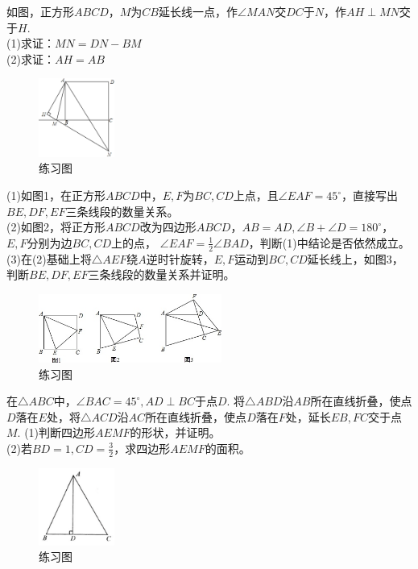 \documentclass{ecnuthesis}
\begin{document}
\begin{problem}
    如图，正方形$ABCD$，$M$为$CB$延长线一点，作$\angle MAN$交$DC$于$N$，作$AH\perp MN$交于$H$.\\
    (1)求证：$MN=DN-BM$ \\
    (2)求证：$AH=AB$
\end{problem}
\begin{figure}[H]
\centering
\includegraphics[width=2.5cm]{picture/6106.png}
\caption{练习图}
\end{figure}
\begin{problem}
    (1)如图1，在正方形$ABCD$中，$E,F$为$BC,CD$上点，且$\angle EAF=45^\circ$，直接写出$BE,DF,EF$三条线段的数量关系。 \\
    (2)如图2，将正方形$ABCD$改为四边形$ABCD$，$AB=AD,\angle B+\angle D=180^\circ$，$E,F$分别为边$BC,CD$上的点，
    $\angle EAF=\frac{1}{2}\angle BAD$，判断(1)中结论是否依然成立。 \\
    (3)在(2)基础上将$\triangle AEF$绕$A$逆时针旋转，$E,F$运动到$BC,CD$延长线上，如图3，判断$BE,DF,EF$三条线段的数量关系并证明。 \\
\end{problem}
\begin{figure}[H]
\centering
\includegraphics[width=6cm]{picture/6107.jpg}
\caption{练习图}
\end{figure}
\begin{problem}
    在$\triangle ABC$中，$\angle BAC=45^\circ,AD\perp BC$于点$D$.
    将$\triangle ABD$沿$AB$所在直线折叠，使点$D$落在$E$处，将$\triangle ACD$沿$AC$所在直线折叠，使点$D$落在$F$处，延长$EB,FC$交于点$M$.
    (1)判断四边形$AEMF$的形状，并证明。\\
    (2)若$BD=1,CD=\frac{3}{2}$，求四边形$AEMF$的面积。 \\
\end{problem}
\begin{figure}[H]
\centering
\includegraphics[width=2.5cm]{picture/6119.png}
\caption{练习图}
\end{figure}
\clearpage
\end{document}
